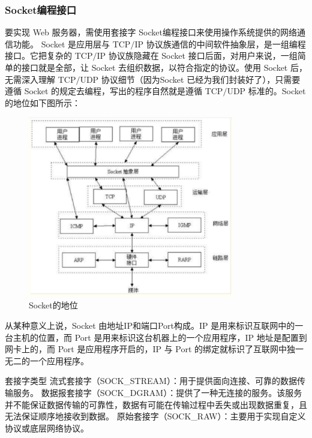 \documentclass[UTF8,12pt]{article}
\begin{document}
\subsubsection{Socket编程接口}
要实现 Web 服务器，需使用套接字 Socket编程接口来使用操作系统提供的网络通信功能。 Socket 是应用层与 TCP$/$IP 协议族通信的中间软件抽象层，是一组编程接口。它把复杂的 TCP$/$IP 协议族隐藏在 Socket 接口后面，对用户来说，一组简单的接口就是全部，让 Socket 去组织数据，以符合指定的协议。使用 Socket 后，无需深入理解 TCP$/$UDP 协议细节（因为Socket 已经为我们封装好了），只需要遵循 Socket 的规定去编程，写出的程序自然就是遵循 TCP$/$UDP 标准的。Socket 的地位如下图所示：
\begin{figure}[htbp]
    \centering
    \includegraphics[width=0.8\textwidth]{img/1.png}
    \caption{Socket的地位}
\end{figure}

从某种意义上说，Socket 由地址IP和端口Port构成。IP 是用来标识互联网中的一台主机的位置，而 Port 是用来标识这台机器上的一个应用程序，IP 地址是配置到网卡上的，而 Port 是应用程序开启的，IP 与 Port 的绑定就标识了互联网中独一无二的一个应用程序。

套接字类型 流式套接字（SOCK\_STREAM）：用于提供面向连接、可靠的数据传输服务。 数据报套接字（SOCK\_DGRAM）：提供了一种无连接的服务。该服务并不能保证数据传输的可靠性，数据有可能在传输过程中丢失或出现数据重复，且无法保证顺序地接收到数据。 原始套接字（SOCK\_RAW）：主要用于实现自定义协议或底层网络协议。
\end{document}
